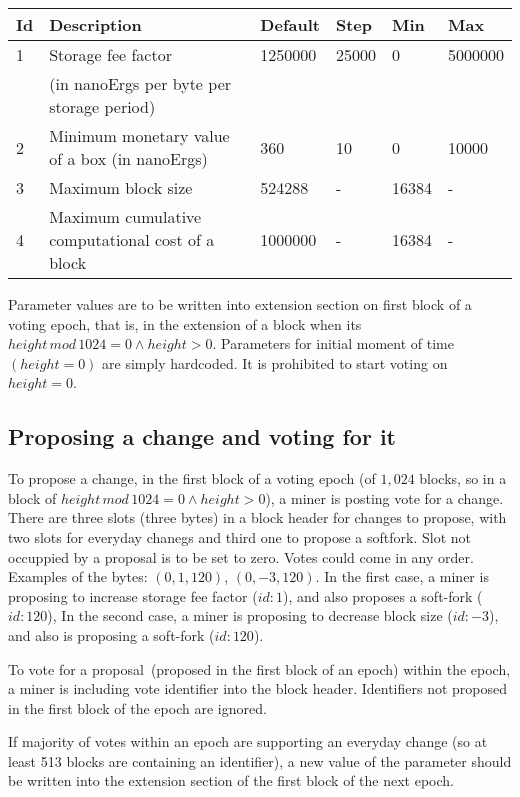 \begin{tabular}{| l | l | l | l | l | l |}
\hline
Id & Description & Default & Step & Min & Max \\
\hline
\hline
1 & Storage fee factor  & 1250000 & 25000 & 0 & 5000000 \\
  &  (in nanoErgs per byte per storage period) & & & & \\
\hline
2 & Minimum monetary value of a box (in nanoErgs) & 360 & 10 & 0 & 10000 \\
\hline
3 & Maximum block size & 524288 & - & 16384 & - \\
\hline
4 & Maximum cumulative computational cost of a block & 1000000 & - & 16384 & - \\
\hline
\end{tabular}

Parameter values are to be written into extension section on first block of a voting epoch, that is, in the extension
of a block when its $height\,mod\,1024 = 0 \land height > 0$. Parameters for initial moment of time~$(height = 0)$ are simply
hardcoded. It is prohibited to start voting on $height = 0$.

\subsection{Proposing a change and voting for it}

To propose a change, in the first block of a voting epoch (of $1,024$ blocks, so in a block of
$height\,mod\,1024 = 0 \land height > 0$), a miner is posting vote for a change. There are three slots (three bytes)
in a block header for changes to propose, with two slots for everyday chanegs and third one to propose a softfork. Slot
not occuppied by a proposal is to be set to zero. Votes could come in any order. Examples of the bytes:
$(0, 1, 120)$, $(0, -3, 120)$. In the first case, a miner is proposing to increase storage fee factor ($id:1$), and
also proposes a soft-fork ($id:120$), In the second case, a miner is proposing to decrease block size ($id:-3$), and also
 is proposing a soft-fork ($id:120$).

To vote for a proposal~(proposed in the first block of an epoch) within the epoch, a miner is including vote identifier
into the block header. Identifiers not proposed in the first block of the epoch are ignored.

If majority of votes within an epoch are supporting an everyday change (so at least 513 blocks are containing an
identifier), a new value of the parameter should be written into the extension section of the first block of the next
epoch.

